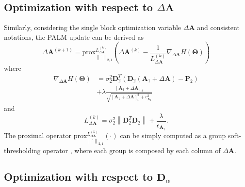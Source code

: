 \documentclass[review]{elsarticle}
\begin{document}
\subsection{Optimization with respect to \texorpdfstring{$\Delta\mathbf{A}$}{DA}}

Similarly, considering the single block optimization variable $\Delta\mathbf{A}$ and consistent notations, the PALM update can be derived as
%
\begin{equation}
		\Delta\mathbf{A}^{(k+1)} = \mathrm{prox}^{L_{\Delta\mathbf{A}}^{(k)} }_{\left\|\cdot\right\|_{2,1}}\left(\Delta\mathbf{A}^{(k)} - \frac{1}{L_{\Delta\mathbf{A}}^{(k)} }\nabla_{\Delta\mathbf{A}} H(\boldsymbol{\Theta}) \right)
        \label{eq:deltacode_Update}
\end{equation}
%
where
\begin{equation}
\begin{aligned}
		\nabla_{\Delta\mathbf{A}} H(\boldsymbol{\Theta}) &= \sigma_{2}^2\mathbf{D}_{2}^{T}\left( \mathbf{D}_{2}\left(\mathbf{A}_{1} + \Delta\mathbf{A}\right)-\mathbf{P}_{2}\right) \\
&+ \lambda \frac{\left[\mathbf{A}_{1} + \Delta\mathbf{A}\right]_{i}}{\sqrt{\left[\mathbf{A}_{1} + \Delta\mathbf{A}\right]_{i}^{2} + \epsilon_{\mathbf{A}_{1}}^{2}}}
        \label{eq:nabla_deltacode}
\end{aligned}
\end{equation}
and
%
\begin{equation}
		L_{\Delta\mathbf{A}}^{(k)} = \sigma_{2}^2\left\|\mathbf{D}_{2}^{T}\mathbf{D}_{2}\right\| + \frac{\lambda}{\epsilon_{\mathbf{A}_{1}}}.
        \label{eq:lip_deltacode}
\end{equation}
%
The proximal operator $\mathrm{prox}^{L_{\Delta\mathbf{A}}^{(k)} }_{\left\|\cdot\right\|_{2,1}}(\cdot)$ can be simply computed as a group soft-thresholding operator \citep{ferraris_robust_2017}, where each group is composed by each column of $\Delta\mathbf{A}$.

\subsection{Optimization with respect to \texorpdfstring{$\mathbf{D}_{\alpha}$}{Da}}
\end{document}
